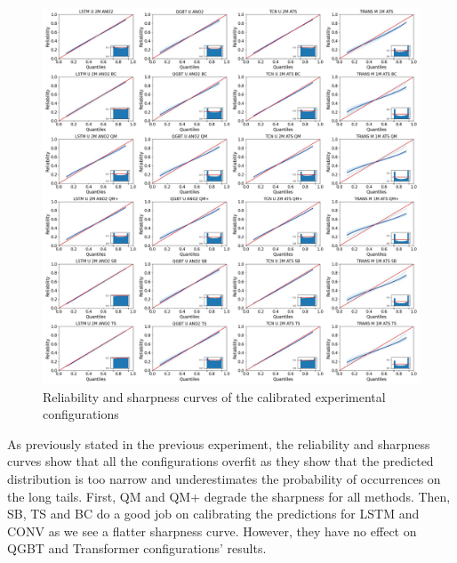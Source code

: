 \documentclass[12pt,a4paper]{book}
\begin{document}
\begin{figure}[h] 
  \centering  
  \includegraphics[width=1\textwidth]{exp3_rel_sharp.jpg}
  \caption{Reliability and sharpness curves of the calibrated  experimental configurations}
  \label{fig:exp3_rel_sharp}
\end{figure}


As previously stated in the previous experiment, the reliability and sharpness curves show that all the configurations overfit as they show that the predicted distribution is too narrow and underestimates the probability of occurrences on the long tails. First, QM and QM+ degrade the sharpness for all methods. Then, SB, TS and BC do a good job on calibrating the predictions for LSTM and CONV as we see a flatter sharpness curve. However, they have no effect on QGBT and Transformer configurations' results.  
\end{document}
